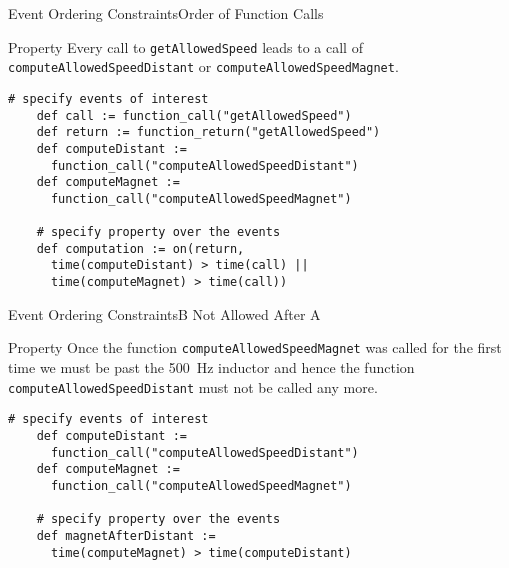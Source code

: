 
\begin{frame}[fragile]{Event Ordering Constraints}{Order of Function Calls}
  \small

  \begin{block}{Property}
    Every call to \texttt{getAllowedSpeed} leads to a call of \texttt{computeAllowedSpeedDistant} or \texttt{computeAllowedSpeedMagnet}.
  \end{block}

  \scriptsize

  \begin{lstlisting}[gobble=4,language=tessla]
    # specify events of interest
    def call := function_call("getAllowedSpeed")
    def return := function_return("getAllowedSpeed")
    def computeDistant :=
      function_call("computeAllowedSpeedDistant")
    def computeMagnet :=
      function_call("computeAllowedSpeedMagnet")

    # specify property over the events
    def computation := on(return,
      time(computeDistant) > time(call) ||
      time(computeMagnet) > time(call))
  \end{lstlisting}
\end{frame}

\begin{frame}[fragile]{Event Ordering Constraints}{B Not Allowed After A}
  \small

  \begin{block}{Property}
    Once the function \texttt{computeAllowedSpeedMagnet} was called for the first time we must be past the 500~Hz inductor and hence the function \texttt{computeAllowedSpeedDistant} must not be called any more.
  \end{block}

  \begin{lstlisting}[gobble=4,language=tessla]
    # specify events of interest
    def computeDistant :=
      function_call("computeAllowedSpeedDistant")
    def computeMagnet :=
      function_call("computeAllowedSpeedMagnet")

    # specify property over the events
    def magnetAfterDistant :=
      time(computeMagnet) > time(computeDistant)
  \end{lstlisting}
\end{frame}

